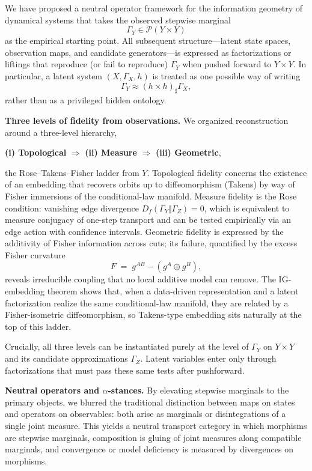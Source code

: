 \documentclass[11pt]{article}
\newcommand{\1}{\mathbf{1}}
\begin{document}
We have proposed a neutral operator framework for the information geometry of dynamical systems that takes the observed stepwise marginal
\[
  \Gamma_Y \in \mathcal P(Y \times Y)
\]
as the empirical starting point. All subsequent structure—latent state spaces, observation maps, and candidate generators—is expressed as factorizations or liftings that reproduce (or fail to reproduce) $\Gamma_Y$ when pushed forward to $Y \times Y$. In particular, a latent system $(X,\Gamma_X,h)$ is treated as one possible way of writing
\[
  \Gamma_Y \approx (h \times h)_{\sharp}\Gamma_X,
\]
rather than as a privileged hidden ontology.     

\medskip
\noindent
\textbf{Three levels of fidelity from observations.}
We organized reconstruction around a three-level hierarchy,
\begin{center}
\textbf{(i) Topological} $\Rightarrow$ \textbf{(ii) Measure} $\Rightarrow$ \textbf{(iii) Geometric},
\end{center}
the Rose–Takens–Fisher ladder from $Y$. Topological fidelity concerns the existence of an embedding that recovers orbits up to diffeomorphism (Takens) by way of Fisher immersions of the conditional-law manifold. Measure fidelity is the Rose condition: vanishing edge divergence $D_f(\Gamma_Y\Vert \Gamma_Z) = 0$, which is equivalent to measure conjugacy of one-step transport and can be tested empirically via an edge action with confidence intervals. Geometric fidelity is expressed by the additivity of Fisher information across cuts; its failure, quantified by the excess Fisher curvature
\[
  F \;=\; g^{AB} - (g^A \oplus g^B),
\]
reveals irreducible coupling that no local additive model can remove. The IG-embedding theorem shows that, when a data-driven representation and a latent factorization realize the same conditional-law manifold, they are related by a Fisher-isometric diffeomorphism, so Takens-type embedding sits naturally at the top of this ladder.

Crucially, all three levels can be instantiated purely at the level of $\Gamma_Y$ on $Y \times Y$ and its candidate approximations $\Gamma_Z$. Latent variables enter only through factorizations that must pass these same tests after pushforward.

\medskip
\noindent
\textbf{Neutral operators and $\alpha$-stances.}
By elevating stepwise marginals to the primary objects, we blurred the traditional distinction between maps on states and operators on observables: both arise as marginals or disintegrations of a single joint measure. This yields a neutral transport category in which morphisms are stepwise marginals, composition is gluing of joint measures along compatible marginals, and convergence or model deficiency is measured by divergences on morphisms.
\end{document}
